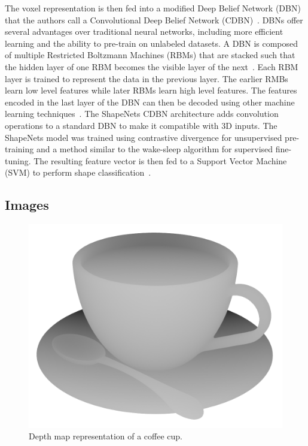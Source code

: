 The voxel representation is then fed into a modified Deep Belief Network (DBN) that the authors call a Convolutional Deep Belief Network (CDBN)~\cite{Wu2015}. DBNs offer several advantages over traditional neural networks, including more efficient learning and the ability to pre-train on unlabeled datasets. A DBN is composed of multiple Restricted Boltzmann Machines (RBMs) that are stacked such that the hidden layer of one RBM becomes the visible layer of the next~\cite{Aljabery2020}. Each RBM layer is trained to represent the data in the previous layer. The earlier RMBs learn low level features while later RBMs learn high level features. The features encoded in the last layer of the DBN can then be decoded using other machine learning techniques~\cite{McAfee2008}. The ShapeNets CDBN architecture adds convolution operations to a standard DBN to make it compatible with 3D inputs. The ShapeNets model was trained using contrastive divergence for unsupervised pre-training and a method similar to the wake-sleep algorithm for supervised fine-tuning. The resulting feature vector is then fed to a Support Vector Machine (SVM) to perform shape classification~\cite{Wu2015}. 


\subsection{Images}

\begin{figure}[h]
	\centering
	\includegraphics[scale=0.2]{Images/Depth Map Cup}
	\caption{Depth map representation of a coffee cup.}
	\label{fig:depth_map_cup}
\end{figure}

